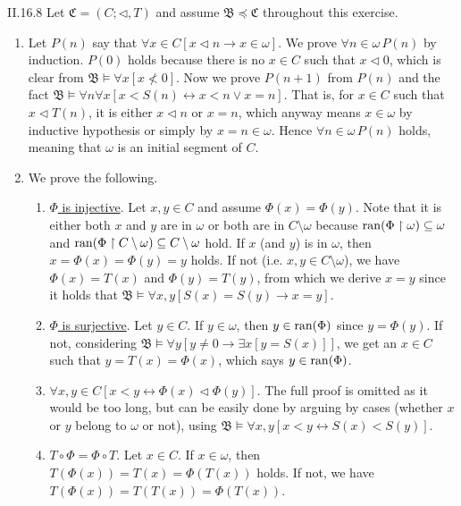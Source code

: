 \documentclass[12pt]{article}
\begin{document}
\begin{customthm}{II.16.8}
  Let $\mathfrak{C}=(C;\triangleleft,T)$ and assume $\mathfrak{B}\preccurlyeq\mathfrak{C}$ throughout this exercise.
  \begin{enumerate}
    \item Let $P(n)$ say that $\forall x\in C[x\triangleleft n\rightarrow x\in\omega]$. We prove $\forall n\in\omega\,P(n)$ by induction. $P(0)$ holds because there is no $x\in C$ such that $x\triangleleft0$, which is clear from $\mathfrak{B}\models\forall x[x\not<0]$. Now we prove $P(n+1)$ from $P(n)$ and the fact $\mathfrak{B}\models\forall n\forall x[x<S(n)\leftrightarrow x<n\vee x=n]$. That is, for $x\in C$ such that $x\triangleleft T(n)$, it is either $x\triangleleft n$ or $x=n$, which anyway means $x\in\omega$ by inductive hypothesis or simply by $x=n\in\omega$. Hence $\forall n\in\omega\,P(n)$ holds, meaning that $\omega$ is an initial segment of $C$.
    \item We prove the following.
    \begin{enumerate}
      \item\underline{$\Phi$ is injective}. Let $x,y\in C$ and assume $\Phi(x)=\Phi(y)$. Note that it is either both $x$ and $y$ are in $\omega$ or both are in $C\setminus\omega$ because $\mathop{\mathrm{ran}}(\Phi\upharpoonright\omega)\subseteq\omega$ and $\mathop{\mathrm{ran}}(\Phi\upharpoonright C\setminus\omega)\subseteq C\setminus\omega$ hold. If $x$ (and $y$) is in $\omega$, then $x=\Phi(x)=\Phi(y)=y$ holds. If not (i.e. $x,y\in C\setminus\omega$), we have $\Phi(x)=T(x)$ and $\Phi(y)=T(y)$, from which we derive $x=y$ since it holds that $\mathfrak{B}\models\forall x,y[S(x)=S(y)\rightarrow x=y]$.
      \item\underline{$\Phi$ is surjective}. Let $y\in C$. If $y\in\omega$, then $y\in\mathop{\mathrm{ran}}(\Phi)$ since $y=\Phi(y)$. If not, considering $\mathfrak{B}\models\forall y[y\neq0\rightarrow\exists x[y=S(x)]]$, we get an $x\in C$ such that $y=T(x)=\Phi(x)$, which says $y\in\mathop{\mathrm{ran}}(\Phi)$.
      \item\underline{$\forall x,y\in C[x<y\leftrightarrow\Phi(x)\triangleleft\Phi(y)]$}. The full proof is omitted as it would be too long, but can be easily done by arguing by cases (whether $x$ or $y$ belong to $\omega$ or not), using $\mathfrak{B}\models\forall x,y[x<y\leftrightarrow S(x)<S(y)]$.
      \item\underline{$T\circ\Phi=\Phi\circ T$}. Let $x\in C$. If $x\in\omega$, then $T(\Phi(x))=T(x)=\Phi(T(x))$ holds. If not, we have $T(\Phi(x))=T(T(x))=\Phi(T(x))$.
    \end{enumerate}

\end{enumerate}
\end{customthm}
\end{document}
